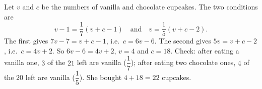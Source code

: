Let $v$ and $c$ be the numbers of vanilla and chocolate cupcakes. The two conditions are
\[
v-1=\dfrac{1}{7}(v+c-1)\quad\text{and}\quad v=\dfrac{1}{5}(v+c-2).
\]
The first gives $7v-7=v+c-1$, i.e.\ $c=6v-6$. The second gives $5v=v+c-2$, i.e.\ $c=4v+2$. So $6v-6=4v+2$, $v=4$ and $c=18$. Check: after eating a vanilla one, $3$ of the $21$ left are vanilla ($\dfrac{1}{7}$); after eating two chocolate ones, $4$ of the $20$ left are vanilla ($\dfrac{1}{5}$). She bought $4+18=\boxed{22}$ cupcakes.

